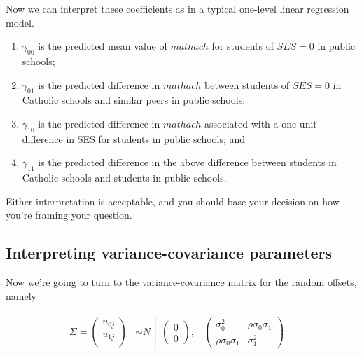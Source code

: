 \documentclass[
  letterpaper,
  DIV=11,
  numbers=noendperiod]{scrreprt}
\begin{document}
Now we can interpret these coefficients as in a typical one-level linear
regression model.

\begin{enumerate}
\def\labelenumi{\arabic{enumi}.}
\item
  \(\gamma_{00}\) is the predicted mean value of \(mathach\) for
  students of \(SES = 0\) in public schools;
\item
  \(\gamma_{01}\) is the predicted difference in \(mathach\) between
  students of \(SES = 0\) in Catholic schools and similar peers in
  public schools;
\item
  \(\gamma_{10}\) is the predicted difference in \(mathach\) associated
  with a one-unit difference in SES for students in public schools; and
\item
  \(\gamma_{11}\) is the predicted difference in the above difference
  between students in Catholic schools and students in public schools.
\end{enumerate}

Either interpretation is acceptable, and you should base your decision
on how you're framing your question.

\hypertarget{interpreting-variance-covariance-parameters}{%
\subsection*{Interpreting variance-covariance
parameters}\label{interpreting-variance-covariance-parameters}}

Now we're going to turn to the variance-covariance matrix for the random
offsets, namely

\[\begin{aligned}
\Sigma = \begin{pmatrix}
u_{0j}\\
u_{1j}\\
\end{pmatrix} &\sim  N
\begin{bmatrix}
\begin{pmatrix}
0\\
0
\end{pmatrix}\!\!,&
\begin{pmatrix}
\sigma^2_0 & \rho\sigma_0\sigma_1\\
\rho\sigma_0\sigma_1 & \sigma^2_1
\end{pmatrix}
\end{bmatrix}
\end{aligned}\]
\end{document}
